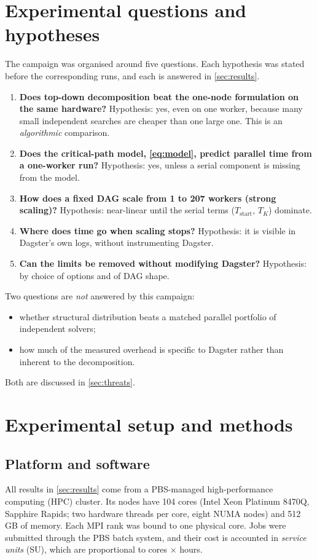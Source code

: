 \documentclass[11pt,a4paper]{article}
\newcommand{\Tstart}{T_{\mathrm{start}}}
\begin{document}
\section{Experimental questions and hypotheses}
\label{sec:questions}
The campaign was organised around five questions. Each hypothesis was stated before the
corresponding runs, and each is answered in \cref{sec:results}.
\begin{enumerate}[label=\textbf{Q\arabic*.}, leftmargin=2.4em]
\item \textbf{Does top-down decomposition beat the one-node formulation on the same hardware?}
      Hypothesis: yes, even on one worker, because many small independent searches are
      cheaper than one large one. This is an \emph{algorithmic} comparison.
\item \textbf{Does the critical-path model, \cref{eq:model}, predict parallel time from a
      one-worker run?} Hypothesis: yes, unless a serial component is missing from the model.
\item \textbf{How does a fixed DAG scale from 1 to 207 workers (strong scaling)?}
      Hypothesis: near-linear until the serial terms ($\Tstart$, $T_K$) dominate.
\item \textbf{Where does time go when scaling stops?} Hypothesis: it is visible in Dagster's
      own logs, without instrumenting Dagster.
\item \textbf{Can the limits be removed without modifying Dagster?} Hypothesis: by choice of
      options and of DAG shape.
\end{enumerate}
\noindent Two questions are \emph{not} answered by this campaign:
\begin{itemize}
\item whether structural distribution beats a matched parallel portfolio of independent
      solvers;
\item how much of the measured overhead is specific to Dagster rather than inherent to the
      decomposition.
\end{itemize}
Both are discussed in \cref{sec:threats}.

\section{Experimental setup and methods}
\label{sec:setup}

\subsection{Platform and software}
All results in \cref{sec:results} come from a PBS-managed high-performance computing (HPC)
cluster. Its nodes have 104 cores (Intel Xeon Platinum 8470Q, Sapphire Rapids; two hardware
threads per core, eight NUMA nodes) and 512\,GB of memory. Each MPI rank was bound to one
physical core. Jobs were
submitted through the PBS batch system, and their cost is accounted in \emph{service units}
(SU), which are proportional to cores $\times$ hours.
\end{document}
